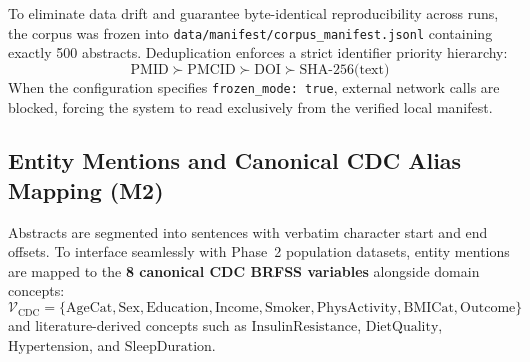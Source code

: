 \documentclass[11pt,a4paper]{article}
\begin{document}
To eliminate data drift and guarantee byte-identical reproducibility across runs, the corpus was frozen into \texttt{data/manifest/corpus\_manifest.jsonl} containing exactly 500 abstracts. Deduplication enforces a strict identifier priority hierarchy:
\begin{equation}
    \text{PMID} \succ \text{PMCID} \succ \text{DOI} \succ \text{SHA-256(text)}
\end{equation}
When the configuration specifies \texttt{frozen\_mode: true}, external network calls are blocked, forcing the system to read exclusively from the verified local manifest.

\subsection{Entity Mentions and Canonical CDC Alias Mapping (M2)}
Abstracts are segmented into sentences with verbatim character start and end offsets. To interface seamlessly with Phase~2 population datasets, entity mentions are mapped to the \textbf{8 canonical CDC BRFSS variables} alongside domain concepts:
\begin{equation}
    \mathcal{V}_{\text{CDC}} = \{\text{AgeCat}, \text{Sex}, \text{Education}, \text{Income}, \text{Smoker}, \text{PhysActivity}, \text{BMICat}, \text{Outcome}\}
\end{equation}
and literature-derived concepts such as $\text{InsulinResistance}$, $\text{DietQuality}$, $\text{Hypertension}$, and $\text{SleepDuration}$.
\end{document}

